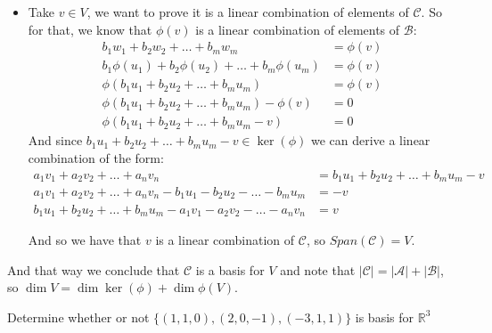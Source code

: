 \documentclass[final,expand]{problemset}
\begin{document}
{\begin{itemize}
		\item Take $v \in V$, we want to prove it is a linear combination of elements of $\mathcal{C}$. So for that, we know that $\phi(v)$ is a linear combination of elements of $\mathcal{B}$:
		\begin{align*}
			b_1w_1 + b_2w_2 + \dots + b_mw_m &= \phi(v)\\
			b_1\phi(u_1) + b_2\phi(u_2) + \dots + b_m\phi(u_m) &= \phi(v)\\
			\phi(b_1u_1 + b_2u_2 + \dots + b_mu_m) &= \phi(v)\\
			\phi(b_1u_1 + b_2u_2 + \dots + b_mu_m) - \phi(v) &= 0\\
			\phi(b_1u_1 + b_2u_2 + \dots + b_mu_m - v) &= 0
		\end{align*}
		And since $b_1u_1 + b_2u_2 + \dots + b_mu_m - v \in \ker(\phi)$ we can derive a linear combination of the form:
		\begin{align*}
			a_1v_1 + a_2v_2 + \dots + a_nv_n &= b_1u_1 + b_2u_2 + \dots + b_mu_m - v\\
			a_1v_1 + a_2v_2 + \dots + a_nv_n - b_1u_1 - b_2u_2 - \dots - b_mu_m &= -v\\
			b_1u_1 + b_2u_2 + \dots + b_mu_m - a_1v_1 - a_2v_2 - \dots - a_nv_n &= v
		\end{align*}

		And so we have that $v$ is a linear combination of $\mathcal{C}$, so $Span(\mathcal{C}) = V$.
	\end{itemize}

	And that way we conclude that $\mathcal{C}$ is a basis for $V$ and note that $|\mathcal{C}| = |\mathcal{A}| + |\mathcal{B}|$, so $\dim V = \dim \ker(\phi) + \dim \phi(V)$.
}

\problem
Determine whether or not $\{(1, 1, 0), (2, 0, -1), (-3, 1, 1)\}$ is basis for $\mathbb{R}^3$
\end{document}
